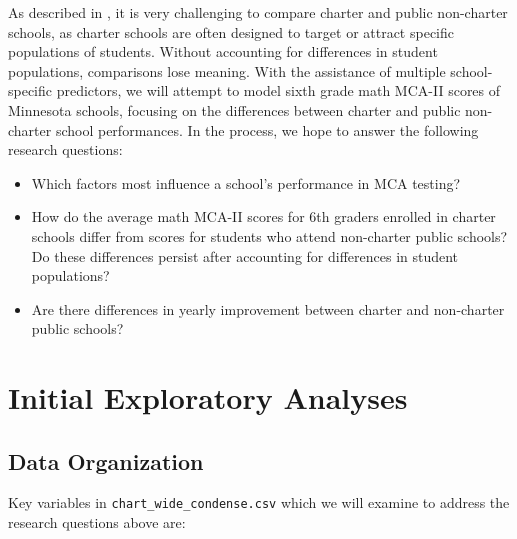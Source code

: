 \documentclass[
]{krantz}
\providecommand{\tightlist}{%
  \setlength{\itemsep}{0pt}\setlength{\parskip}{0pt}}
\begin{document}
As described in \citet{Green2003}, it is very challenging to compare charter and public non-charter schools, as charter schools are often designed to target or attract specific populations of students. Without accounting for differences in student populations, comparisons lose meaning. With the assistance of multiple school-specific predictors, we will attempt to model sixth grade math MCA-II scores of Minnesota schools, focusing on the differences between charter and public non-charter school performances. In the process, we hope to answer the following research questions:

\begin{itemize}
\tightlist
\item
  Which factors most influence a school's performance in MCA testing?
\item
  How do the average math MCA-II scores for 6th graders enrolled in charter schools differ from scores for students who attend non-charter public schools? Do these differences persist after accounting for differences in student populations?
\item
  Are there differences in yearly improvement between charter and non-charter public schools?
\end{itemize}

\section{Initial Exploratory Analyses}\label{exploratoryanalysis}

\subsection{Data Organization}\label{data}

Key variables in \texttt{chart\_wide\_condense.csv} which we will examine to address the research questions above are:
\end{document}
